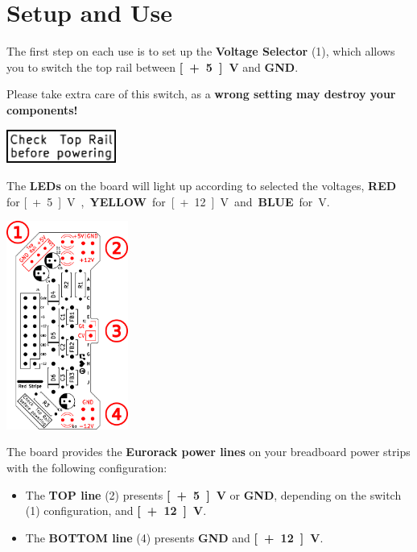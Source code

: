 \documentclass[a4paper,
               11pt,
               parskip=half,
               headinclude,
               titlepage=false]{scrartcl}
\begin{document}
\begin{minipage}[]{10.5cm}
\setlength{\parskip}{\medskipamount}
\section*{Setup and Use}

The first step on each use is to set up the \textbf{\color{red}Voltage Selector} (1), which allows you to switch the top rail between \textbf{\unit[+5]V} and \textbf{GND}.

Please take extra care of this switch, as a \textbf{wrong setting may destroy your components!}


\begin{center}
\includegraphics[height=3em]{check-power-rail-warning}
\end{center}

The \textbf{LEDs} on the board will light up according to selected the voltages,
\textbf{\color{red}RED} for \unit[+5]V, \textbf{\color{orange!80}YELLOW} for \unit[+12]V and \textbf{\color{blue}BLUE} for \unit[-12]V.

\end{minipage}%
\hspace{0.5cm}
\begin{minipage}[]{4cm}
\vspace{-1cm}
\includegraphics[width=4cm]{eurorack-power-breakout-labels}
\end{minipage}

\vspace{2em}

The board provides the \textbf{Eurorack power lines} on your breadboard power strips with the following configuration:
\begin{itemize}
 \item The \textbf{TOP line} (2) presents \textbf{\color{red}\unit[+5]V} or \textbf{\color{red}GND}, depending on the switch (1) configuration, and \textbf{\color{red}\unit[+12]V}.
 \item The \textbf{BOTTOM line} (4) presents \textbf{\color{red}GND} and \textbf{\color{red}\unit[+12]V}.
\end{itemize}
\end{document}
